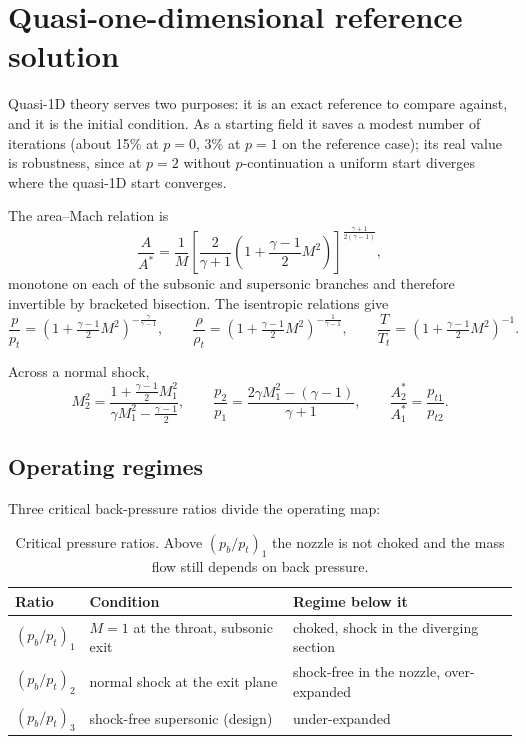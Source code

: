 \documentclass[11pt,a4paper]{article}
\begin{document}
\section{Quasi-one-dimensional reference solution}
\label{sec:quasi1d}

Quasi-1D theory serves two purposes: it is an exact reference to compare against,
and it is the initial condition.  As a starting field it saves a modest number
of iterations (about 15\% at $p = 0$, 3\% at $p = 1$ on the reference case); its
real value is robustness, since at $p = 2$ without $p$-continuation a uniform
start diverges where the quasi-1D start converges.

The area--Mach relation is
\begin{equation}
  \frac{A}{A^{*}} = \frac{1}{M}
  \left[\frac{2}{\gamma+1}\left(1 + \frac{\gamma-1}{2}M^{2}\right)
  \right]^{\frac{\gamma+1}{2(\gamma-1)}},
  \label{eq:areamach}
\end{equation}
monotone on each of the subsonic and supersonic branches and therefore invertible
by bracketed bisection.  The isentropic relations give
\begin{equation}
  \frac{p}{p_t} = \left(1 + \tfrac{\gamma-1}{2}M^{2}\right)^{-\frac{\gamma}{\gamma-1}},
  \qquad
  \frac{\rho}{\rho_t} = \left(1 + \tfrac{\gamma-1}{2}M^{2}\right)^{-\frac{1}{\gamma-1}},
  \qquad
  \frac{T}{T_t} = \left(1 + \tfrac{\gamma-1}{2}M^{2}\right)^{-1}.
\end{equation}

Across a normal shock,
\begin{equation}
  M_2^{2} = \frac{1 + \frac{\gamma-1}{2}M_1^{2}}{\gamma M_1^{2} - \frac{\gamma-1}{2}},
  \qquad
  \frac{p_2}{p_1} = \frac{2\gamma M_1^{2} - (\gamma-1)}{\gamma+1},
  \qquad
  \frac{A_2^{*}}{A_1^{*}} = \frac{p_{t1}}{p_{t2}} .
  \label{eq:shock}
\end{equation}

\subsection{Operating regimes}

Three critical back-pressure ratios divide the operating map:

\begin{table}[H]
  \centering
  \small
  \begin{tabular}{llp{7.6cm}}
    \toprule
    Ratio & Condition & Regime below it \\
    \midrule
    $(p_b/p_t)_1$ & $M = 1$ at the throat, subsonic exit & choked, shock in the diverging section \\
    $(p_b/p_t)_2$ & normal shock at the exit plane       & shock-free in the nozzle, over-expanded \\
    $(p_b/p_t)_3$ & shock-free supersonic (design)       & under-expanded \\
    \bottomrule
  \end{tabular}
  \caption{Critical pressure ratios.  Above $(p_b/p_t)_1$ the nozzle is not
    choked and the mass flow still depends on back pressure.}
  \label{tab:regimes}
\end{table}
\end{document}
